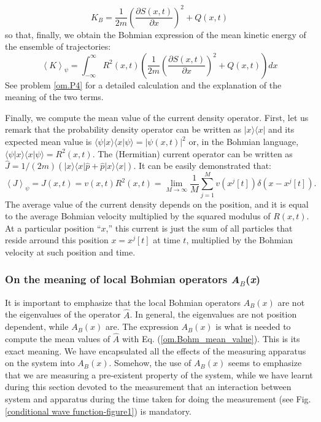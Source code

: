 \documentclass[nofootinbib, secnumarabic, amsmath, nobibnotes,10pt,aps,pra]{revtex4-1}
\newcommand{\ket}[1]{\ensuremath{|#1\rangle}}
\newcommand{\bra}[1]{\ensuremath{\langle#1|}}
\newcommand{\braket}[2]{\langle#1|#2\rangle}
\newcommand{\fref}[1]{Fig. \ref{#1}}
\newcommand{\eref}[1]{Eq. (\ref{#1})}
\newcommand{\abs}[1]{\left| #1 \right|} %
\newcommand{\avg}[1]{\left\langle #1 \right\rangle} %
\begin{document}
\begin{equation}
\label{om.local_kinetic_energy_mean_B_bis}
K_B = \frac {1} {2m}\left(\frac {\partial S(x,t)} {\partial x} \right)^2 + Q(x,t)
\end{equation}
so that, finally, we obtain the Bohmian expression of the mean kinetic energy of the ensemble of trajectories:
\begin{equation}
\label{om.kinetic_energy_mean_B}
\avg{K}_{\psi} = \int_{-\infty}^{\infty} R^2(x,t) \left( \frac {1} {2m} \left(\frac {\partial S(x,t)} {\partial x} \right)^2 + Q(x,t)\right) dx
\end{equation}
See problem \ref{om.P4} for a detailed calculation and the explanation of the meaning of the two terms.

Finally, we compute the mean value of the current density operator. First, let us remark that the probability density operator can be written as $\ket{x}\bra{x}$ and its expected mean value is $\braket{\psi}{x} \braket{x}{\psi} = \abs{\psi(x,t)}^2$ or, in the Bohmian language, $\braket{\psi}{x} \braket{x}{\psi} = R^2(x,t)$. The (Hermitian) current operator can be written as $\hat{J} = 1/(2m) (\ket{x}\bra{x}\hat{p} + \hat{p}\ket{x}\bra{x})$. It can be easily demonstrated that:
\begin{equation}
\avg{J}_{\psi}=J(x,t)=v(x,t) R^2(x,t)=\lim_{M\rightarrow\infty} \frac {1} {M} \sum_{j=1}^{M} v(x^j[t]) \delta(x-x^j[t]).
\end{equation}
The average value of the current density depends on the position,
and it is equal to the average Bohmian velocity multiplied by the
squared modulus of $R(x,t)$. At a particular position ``$x$,'' this
current is just the sum of all particles that reside arround this
position $x = x^j[t]$ at time $t$, multiplied by the Bohmian velocity at such position and time. 

\subsubsection{On the meaning of local Bohmian operators \textit{A}$_\textit{B}$(\textit{x})}

It is important to emphasize that the local Bohmian operators
$A_B(x)$ are not the eigenvalues of the operator $\hat{A}$. In
general, the eigenvalues are not position dependent, while $A_B(x)$
are. The expression $A_B(x)$ is what is needed to compute the mean
values of $\hat{A}$ with \eref{om.Bohm_mean_value}. This is its
exact meaning. We have encapsulated all the effects of the measuring apparatus on the system into $A_B(x)$. Somehow, the use of $A_B(x)$ seems to emphasize that we are measuring a pre-existent property of the system, while we have learnt during this section devoted to the measurement that an interaction between system and apparatus during the time taken for doing the measurement (see \fref{conditional wave function-figure1}) is mandatory. 
\end{document}
